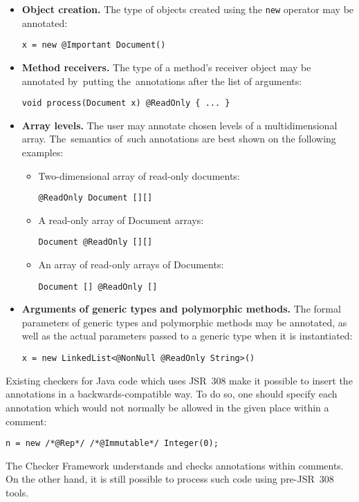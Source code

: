\documentclass{pracamgr}
\theoremstyle{break}
\theoremstyle{break}
\theoremstyle{break}
\begin{document}
\begin{itemize}
\item \textbf{Object creation.} The type of objects created using the
  \texttt{new} operator may be annotated:
  \begin{center} 
    \texttt{x = new @Important Document()}
  \end{center}
\item \textbf{Method receivers.} The type of a method's receiver
  object may be annotated by~putting the~annotations after the list of
  arguments:
  \begin{center} 
    \texttt{void process(Document x) @ReadOnly \{ ... \}}
  \end{center}
\item \textbf{Array levels.} The user may annotate chosen levels of a
  multidimensional array. The~semantics of~such annotations are best
  shown on the following examples:
  \begin{itemize}
  \item Two-dimensional array of read-only documents: 
    \begin{center}
      \texttt{@ReadOnly Document [][]}
    \end{center}
  \item A read-only array of Document arrays:
    \begin{center}
      \texttt{Document @ReadOnly [][]}
    \end{center}
  \item An array of read-only arrays of Documents:
    \begin{center}
      \texttt{Document [] @ReadOnly []}
    \end{center}
  \end{itemize}
\item \textbf{Arguments of generic types and polymorphic methods.} The
  formal parameters of generic types and polymorphic methods may be
  annotated, as well as the actual parameters passed to a generic type
  when it is instantiated:
  \begin{center}
    \texttt{x = new LinkedList<@NonNull @ReadOnly String>()}
  \end{center}
\end{itemize}

Existing checkers for Java code which uses JSR~308 make it possible to
insert the annotations in a backwards-compatible way. To do so, one
should specify each annotation which would not normally be allowed in
the given place within a comment: 
\begin{center}
  \texttt{n = new /*@Rep*/ /*@Immutable*/ Integer(0);}
\end{center}
The Checker Framework understands and checks annotations within
comments. On the other hand, it is still possible to process such code
using pre-JSR~308 tools.
\end{document}
